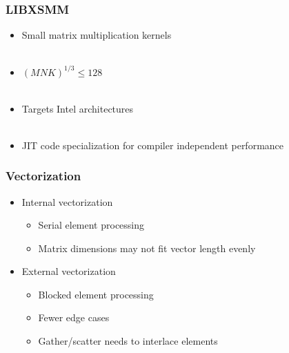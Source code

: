\documentclass{beamer}
\begin{document}

\begin{frame}
\begin{center}
\frametitle{LIBXSMM}

\begin{itemize}

\item Small matrix multiplication kernels\\

~\\

\item $\left( M N K \right)^{1 / 3} \leq 128$\\

~\\

\item Targets Intel architectures\\

~\\

\item JIT code specialization for compiler independent performance

\end{itemize}

\end{center}
\end{frame}


\begin{frame}
\begin{center}
\frametitle{Vectorization}

\begin{itemize}

\item Internal vectorization

\begin{itemize}

\item Serial element processing

\item Matrix dimensions may not fit vector length evenly

\end{itemize}

\item External vectorization

\begin{itemize}

\item Blocked element processing

\item Fewer edge cases

\item Gather/scatter needs to interlace elements

\end{itemize}

\end{itemize}

\end{center}
\end{frame}
\end{document}
